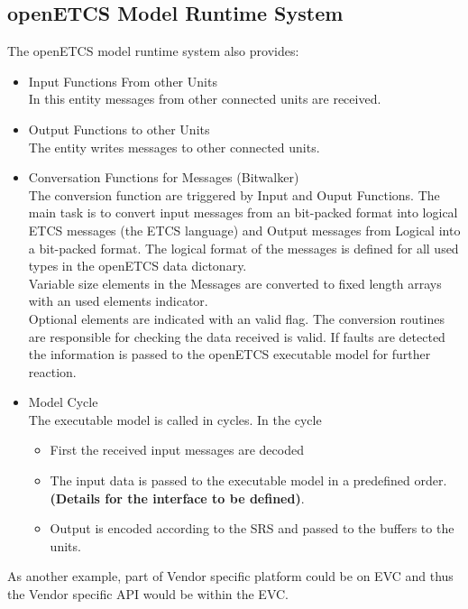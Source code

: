 \documentclass{template/openetcs_report}
\begin{document}
\subsection{openETCS Model Runtime System}
The openETCS model runtime system also provides:

\begin{itemize}
\item Input Functions From other Units\\
In this entity messages from other connected units are received.
\item Output Functions to other Units\\
The entity writes messages to other connected units.
\item Conversation Functions for Messages (Bitwalker)\\
The conversion function are triggered by Input and Ouput Functions. The main task is to convert input messages from an bit-packed format into logical ETCS messages (the ETCS language) and Output messages from Logical into a bit-packed format. The logical format of the messages is defined for all used types in the openETCS data dictonary. \\
Variable size elements in the Messages are converted to fixed length arrays with an used elements indicator.\\
Optional elements are indicated with an valid flag.
The conversion routines are responsible for checking the data received is valid. If  faults are detected the information is passed to the openETCS executable model for further reaction. 
\item Model Cycle\\
The executable model is called in cycles. In the cycle 
\begin{itemize}
\item First the received input messages are decoded
\item The input data is passed to the executable model in a predefined order. \textbf{(Details for the interface to be defined)}.
\item Output is encoded according to the SRS and passed to the  buffers to the units.
\end{itemize}

\end{itemize}

As another example, part of Vendor specific platform could be on EVC
and thus the Vendor specific API would be within the EVC.

\newpage
\end{document}
